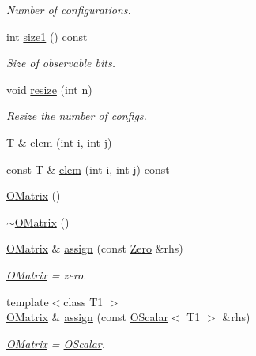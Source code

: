 \begin{DoxyCompactItemize}
\begin{DoxyCompactList}\small\item\em Number of configurations. \end{DoxyCompactList}\item 
int \mbox{\hyperlink{classENSEM_1_1OMatrix_a850b4d2a93be69f82df4a2d0165bc397}{size1}} () const
\begin{DoxyCompactList}\small\item\em Size of observable bits. \end{DoxyCompactList}\item 
void \mbox{\hyperlink{classENSEM_1_1OMatrix_abb999e63b84b6d958e43443dc04e46be}{resize}} (int n)
\begin{DoxyCompactList}\small\item\em Resize the number of configs. \end{DoxyCompactList}\item 
T \& \mbox{\hyperlink{classENSEM_1_1OMatrix_a0a15388ff6dc8159664f6dc14a35b399}{elem}} (int i, int j)
\item 
const T \& \mbox{\hyperlink{classENSEM_1_1OMatrix_a27e0c9e142522126542006530bd7007b}{elem}} (int i, int j) const
\item 
\mbox{\hyperlink{classENSEM_1_1OMatrix_a65e880b856888dfd55e3f96b87afa0e7}{O\+Matrix}} ()
\item 
\mbox{\hyperlink{classENSEM_1_1OMatrix_a776f568bf59002385426232cba0c0d57}{$\sim$\+O\+Matrix}} ()
\item 
\mbox{\hyperlink{classENSEM_1_1OMatrix}{O\+Matrix}} \& \mbox{\hyperlink{classENSEM_1_1OMatrix_a9b8826edfb36e1bc701a7778424cfe31}{assign}} (const \mbox{\hyperlink{structENSEM_1_1Zero}{Zero}} \&rhs)
\begin{DoxyCompactList}\small\item\em \mbox{\hyperlink{classENSEM_1_1OMatrix}{O\+Matrix}} = zero. \end{DoxyCompactList}\item 
{\footnotesize template$<$class T1 $>$ }\\\mbox{\hyperlink{classENSEM_1_1OMatrix}{O\+Matrix}} \& \mbox{\hyperlink{classENSEM_1_1OMatrix_af0aaac940f907eb3db104e9f57b90a4f}{assign}} (const \mbox{\hyperlink{classENSEM_1_1OScalar}{O\+Scalar}}$<$ T1 $>$ \&rhs)
\begin{DoxyCompactList}\small\item\em \mbox{\hyperlink{classENSEM_1_1OMatrix}{O\+Matrix}} = \mbox{\hyperlink{classENSEM_1_1OScalar}{O\+Scalar}}. \end{DoxyCompactList}\item 

\end{DoxyCompactItemize}
